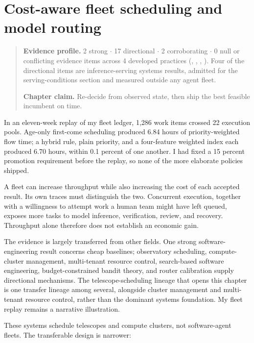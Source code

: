\chapter{Cost-aware fleet scheduling and model routing}
\label{ch19-cost-aware-fleet-scheduling-model-routing}
\begin{quote}
\textbf{Evidence profile.} 2 strong \(\cdot\) 17 directional \(\cdot\) 2 corroborating \(\cdot\) 0 null or conflicting evidence items across 4 developed practices (, , , ). Four of the directional items are inference-serving systems results, admitted for the serving-conditions section and measured outside any agent fleet.

\textbf{Chapter claim.} Re-decide from observed state, then ship the best feasible incumbent on time.
\end{quote}

In an eleven-week replay of my fleet ledger, 1,286 work items crossed 22 execution pools. Age-only first-come scheduling produced 6.84 hours of priority-weighted flow time; a hybrid rule, plain priority, and a four-feature weighted index each produced 6.70 hours, within 0.1 percent of one another. I had fixed a 15 percent promotion requirement before the replay, so none of the more elaborate policies shipped.

A fleet can increase throughput while also increasing the cost of each accepted result. Its own traces must distinguish the two. Concurrent execution, together with a willingness to attempt work a human team might have left queued, exposes more tasks to model inference, verification, review, and recovery. Throughput alone therefore does not establish an economic gain.

The evidence is largely transferred from other fields. One strong software-engineering result concerns cheap baselines; observatory scheduling, compute-cluster management, multi-tenant resource control, search-based software engineering, budget-constrained bandit theory, and router calibration supply directional mechanisms. The telescope-scheduling lineage that opens this chapter is one transfer lineage among several, alongside cluster management and multi-tenant resource control, rather than the dominant systems foundation. My fleet replay remains a narrative illustration.


These systems schedule telescopes and compute clusters, not software-agent fleets. The transferable design is narrower:


